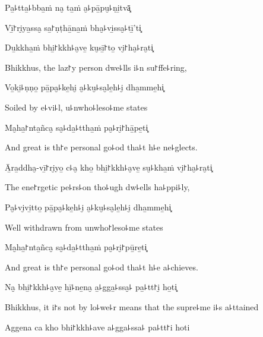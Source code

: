 Pa̱꜕tta̱꜕bba̱ṁ na̮ ta̱ṁ a̮꜕pā̱pu̮꜕ṇi̱tvā͓


Vī̱꜓ri̮ya̱ssa̮ sa̱꜓ṇṭhā̱na̱ṁ bha̮꜕vi̱ssa̮꜕tī̱'ti͓


Du̱kkha̱ṁ bhi̱꜓kkh꜕a̮ve̱ ku̮sī̱꜓to̱ vi̮꜓ha̮꜕ra̮ti͓

\begin{english}
  Bhikkhus, the laz꜓y person dwe꜕lls i꜕n su꜓ffe꜕ring,
\end{english}

Vo̱ki̱꜕ṇṇo̱ pā̱pa̮꜕ke̱hi̮ a̮꜕ku̮꜕sa̮le̱h꜕i̮ dha̱mme̱hi͓

\begin{english}
  Soiled by e꜕vi꜕l, u꜕nwho꜕leso꜕me states
\end{english}

Ma̮ha̱꜓nta̱ñca̮ sa̮꜕da̱꜕ttha̱ṁ pa̮꜕ri̮꜓hā̱pe̱ti͓

\begin{english}
  And great is th꜓e personal go꜕od tha꜕t h꜕e ne꜕glects.
\end{english}

\ifaivedition
\clearpage
\fi

Ā̱ra̱ddha̮-vī̱꜓ri̮yo̱ c꜕a̮ kho̱ bhi̱꜓kkh꜕a̮ve̱ su̮꜕kha̱ṁ vi̮꜓ha̮꜕ra̮ti͓

\begin{english}
  The ene꜓rgetic pe꜕rs꜕on tho꜕ugh dw꜕ells ha꜕ppi꜕ly,
\end{english}

Pa̮꜕vi̮vi̱tto̱ pā̱pa̮꜕ke̱h꜕i̮ a̮꜕ku̮꜕sa̮le̱h꜕i̮ dha̱mme̱hi͓

\begin{english}
  Well withdrawn from unwho꜓leso꜕me states
\end{english}

Ma̮ha̱꜓nta̱ñca̮ sa̮꜕da̱꜕ttha̱ṁ pa̮꜕ri̮꜓pū̱re̱ti͓

\begin{english}
  And great is th꜓e personal go꜕od tha꜕t h꜕e a꜕chieves.
\end{english}

Na̮ bhi̱꜓kkh꜕a̮ve̱ hī̱꜕ne̱na̮ a̱꜕gga̱꜕ssa̮꜕ pa̱꜕tt꜓i̮ ho̱ti͓

\begin{english}
  Bhikkhus, it i꜓s not by lo꜕we꜕r means that the supre꜕me i꜕s a꜕ttained
\end{english}

Aggena ca kho bhi꜓kkh꜕ave a꜕gga꜕ssa꜕ pa꜕tt꜓i hoti

